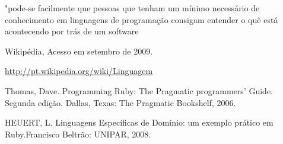 \documentclass[12pt]{article}
\begin{document}
"pode-se facilmente que pessoas que tenham um mínimo necessário de conhecimento em linguagens de programação consigam entender o quê está acontecendo por trás de um software 
 \cite {dslLeandro}




\begin{thebibliography}{9} 
Wikipédia, 
Acesso em setembro de 2009.

\url{http://pt.wikipedia.org/wiki/Linguagem}

Thomas, Dave. 
Programming Ruby: The Pragmatic programmers’ Guide. 
Segunda edição. Dallas, Texas: The Pragmatic Bookshelf, 2006.


HEUERT, L. Linguagens Específicas de Domínio: um exemplo prático em Ruby.Francisco Beltrão: UNIPAR, 2008.

\end{thebibliography} 
\end{document}
